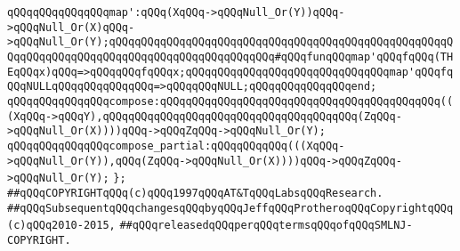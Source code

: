 \verb|qQQqqQQqqQQqqQQqmap':qQQq(XqQQq->qQQqNull_Or(Y))qQQq->qQQqNull_Or(X)qQQq->qQQqNull_Or(Y);qQQqqQQqqQQqqQQqqQQqqQQqqQQqqQQqqQQqqQQqqQQqqQQqqQQqqQQqqQQqqQQqqQQqqQQqqQQqqQQqqQQqqQQqqQQqqQQq#qQQqfunqQQqmap'qQQqfqQQq(THEqQQqx)qQQq=>qQQqqQQqfqQQqx;qQQqqQQqqQQqqQQqqQQqqQQqqQQqqQQqmap'qQQqfqQQqNULLqQQqqQQqqQQqqQQq=>qQQqqQQqNULL;qQQqqQQqqQQqqQQqend;|\newline
\newline
\verb|qQQqqQQqqQQqqQQqcompose:qQQqqQQqqQQqqQQqqQQqqQQqqQQqqQQqqQQqqQQqqQQq(((XqQQq->qQQqY),qQQqqQQqqQQqqQQqqQQqqQQqqQQqqQQqqQQqqQQq(ZqQQq->qQQqNull_Or(X))))qQQq->qQQqZqQQq->qQQqNull_Or(Y);|\newline
\verb|qQQqqQQqqQQqqQQqcompose_partial:qQQqqQQqqQQq(((XqQQq->qQQqNull_Or(Y)),qQQq(ZqQQq->qQQqNull_Or(X))))qQQq->qQQqZqQQq->qQQqNull_Or(Y);|\newline
\newline
\verb|};|\newline
\newline
\newline
\newline
\newline
\verb|##qQQqCOPYRIGHTqQQq(c)qQQq1997qQQqAT&TqQQqLabsqQQqResearch.|\newline
\verb|##qQQqSubsequentqQQqchangesqQQqbyqQQqJeffqQQqProtheroqQQqCopyrightqQQq(c)qQQq2010-2015,|\newline
\verb|##qQQqreleasedqQQqperqQQqtermsqQQqofqQQqSMLNJ-COPYRIGHT.|\newline

